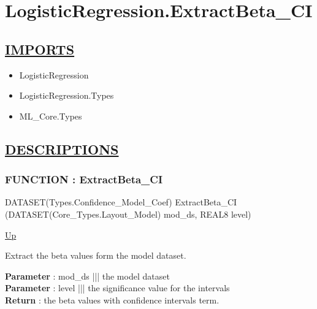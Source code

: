 \chapter*{LogisticRegression.ExtractBeta\_CI}
\hypertarget{ecldoc:toc:LogisticRegression.ExtractBeta_CI}{}

\section*{\underline{IMPORTS}}
\begin{itemize}
\item LogisticRegression
\item LogisticRegression.Types
\item ML\_Core.Types
\end{itemize}

\section*{\underline{DESCRIPTIONS}}
\subsection*{FUNCTION : ExtractBeta\_CI}
\hypertarget{ecldoc:logisticregression.extractbeta_ci}{}
\begin{minipage}[t]{\textwidth}
\begin{flushleft}
DATASET(Types.Confidence\_Model\_Coef) ExtractBeta\_CI (DATASET(Core\_Types.Layout\_Model) mod\_ds, REAL8 level)
\end{flushleft}
\end{minipage}
\hyperlink{ecldoc:toc:LogisticRegression}{Up}

\par
Extract the beta values form the model dataset.
\par
\textbf{Parameter} : mod\_ds ||| the model dataset \\
\textbf{Parameter} : level ||| the significance value for the intervals \\
\textbf{Return} : the beta values with confidence intervals term. \\
